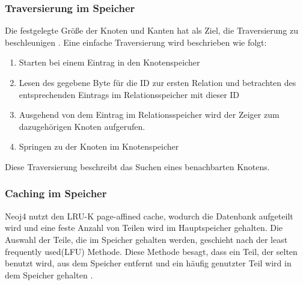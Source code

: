 \subsubsection {Traversierung im Speicher}
Die festgelegte Größe der Knoten und Kanten hat als Ziel, die Traversierung zu beschleunigen \parencite{robinson2013graph}. Eine einfache Traversierung wird beschrieben wie folgt: 
\begin{enumerate}
	\item Starten bei einem Eintrag in den Knotenspeicher
	\item Lesen des gegebene Byte für die ID zur ersten Relation und betrachten des entsprechenden Eintrags im Relationsspeicher mit dieser ID
	\item Ausgehend von dem Eintrag im Relationsspeicher wird der Zeiger zum dazugehörigen Knoten aufgerufen.
	\item Springen zu der Knoten im Knotenspeicher
\end{enumerate}
Diese Traversierung beschreibt das Suchen eines benachbarten Knotens.
\subsubsection{Caching im Speicher}
Neoj4 nutzt den LRU-K page-affined cache, wodurch die Datenbank aufgeteilt wird und eine feste Anzahl von Teilen wird im Hauptspeicher gehalten. Die Auswahl der Teile, die im Speicher gehalten werden, geschieht nach der least frequently used(LFU) Methode. Diese Methode besagt, dass ein Teil, der selten benutzt wird, aus dem Speicher entfernt und ein häufig genutzter Teil wird in dem Speicher gehalten \parencite{robinson2013graph}.
